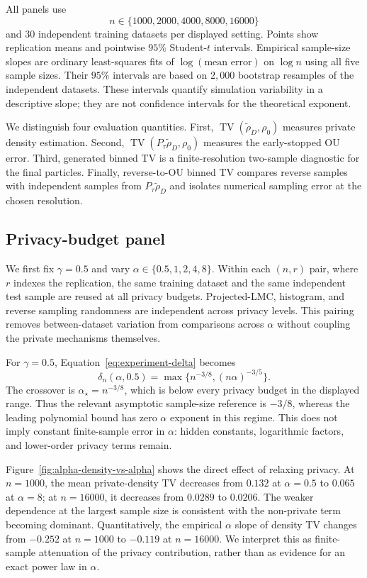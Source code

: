 \documentclass[11pt]{article}
\begin{document}
All panels use
\[
  n\in\{1000,2000,4000,8000,16000\}
\]
and $30$ independent training datasets per displayed setting.  Points show
replication means and pointwise $95\%$ Student-$t$ intervals.  Empirical
sample-size slopes are ordinary least-squares fits of
$\log(\text{mean error})$ on $\log n$ using all five sample sizes.  Their
$95\%$ intervals are based on $2{,}000$ bootstrap resamples of the independent
datasets.  These intervals quantify simulation variability in a descriptive
slope; they are not confidence intervals for the theoretical exponent.

We distinguish four evaluation quantities.  First,
$\operatorname{TV}(\widetilde\rho_D,\rho_0)$ measures private density
estimation.  Second,
$\operatorname{TV}(P_\tau\widetilde\rho_D,\rho_0)$ measures the
early-stopped OU error.  Third, generated binned TV is a finite-resolution
two-sample diagnostic for the final particles.  Finally, reverse-to-OU binned
TV compares reverse samples with independent samples from
$P_\tau\widetilde\rho_D$ and isolates numerical sampling error at the chosen
resolution.

\subsection{Privacy-budget panel}
\label{sec:alpha-panel}

We first fix $\gamma=0.5$ and vary
$\alpha\in\{0.5,1,2,4,8\}$.  Within each $(n,r)$ pair, where $r$ indexes the
replication, the same training dataset and the same independent test sample
are reused at all privacy budgets.  Projected-LMC, histogram, and reverse
sampling randomness are independent across privacy levels.  This pairing
removes between-dataset variation from comparisons across $\alpha$ without
coupling the private mechanisms themselves.

For $\gamma=0.5$, Equation~\eqref{eq:experiment-delta} becomes
\begin{equation}
  \delta_n(\alpha,0.5)
  =\max\{n^{-3/8},(n\alpha)^{-3/5}\}.
  \label{eq:alpha-panel-rate}
\end{equation}
The crossover is $\alpha_\star=n^{-3/8}$, which is below every privacy budget
in the displayed range.  Thus the relevant asymptotic sample-size reference is
$-3/8$, whereas the leading polynomial bound has zero $\alpha$ exponent in
this regime.  This does not imply constant finite-sample error in $\alpha$:
hidden constants, logarithmic factors, and lower-order privacy terms remain.

Figure~\ref{fig:alpha-density-vs-alpha} shows the direct effect of relaxing
privacy.  At $n=1000$, the mean private-density TV decreases from $0.132$ at
$\alpha=0.5$ to $0.065$ at $\alpha=8$; at $n=16000$, it decreases from
$0.0289$ to $0.0206$.  The weaker dependence at the largest sample size is
consistent with the non-private term becoming dominant.  Quantitatively, the
empirical $\alpha$ slope of density TV changes from $-0.252$ at $n=1000$ to
$-0.119$ at $n=16000$.  We interpret this as finite-sample attenuation of the
privacy contribution, rather than as evidence for an exact power law in
$\alpha$.
\end{document}

